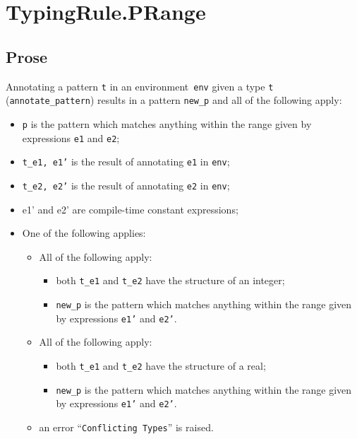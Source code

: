 \documentclass{book}
\begin{document}
\section{TypingRule.PRange \label{sec:TypingRule.PRange}}

    \subsection{Prose}
   Annotating a pattern \texttt{t} in an environment~\texttt{env} given a type \texttt{t} (\texttt{annotate\_pattern}) results in a pattern \texttt{new\_p} and all of the following apply:
   \begin{itemize}
   \item \texttt{p} is the pattern which matches anything within the range given by
      expressions \texttt{e1} and \texttt{e2};
   \item \texttt{t\_e1, e1'} is the result of annotating \texttt{e1} in \texttt{env};
   \item \texttt{t\_e2, e2'} is the result of annotating \texttt{e2} in \texttt{env};
   \item e1' and e2' are compile-time constant expressions;
   \item One of the following applies:
     \begin{itemize}
     \item All of the following apply:
           \begin{itemize}
           \item both \texttt{t\_e1} and \texttt{t\_e2} have the structure of an integer;
           \item \texttt{new\_p} is the pattern which matches anything within the range given by
      expressions \texttt{e1'} and \texttt{e2'}.
           \end{itemize}
     \item All of the following apply:
           \begin{itemize}
           \item both \texttt{t\_e1} and \texttt{t\_e2} have the structure of a real;
           \item \texttt{new\_p} is the pattern which matches anything within the range given by
      expressions \texttt{e1'} and \texttt{e2'}.
           \end{itemize}
     \item an error ``\texttt{Conflicting Types}'' is raised.
     \end{itemize}
   \end{itemize}
\end{document}
